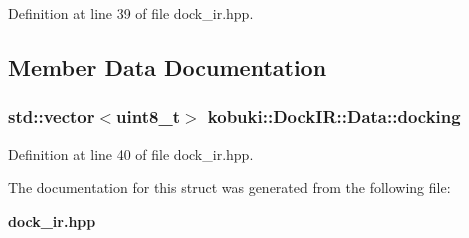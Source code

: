 \-Definition at line 39 of file dock\-\_\-ir.\-hpp.



\subsection{\-Member \-Data \-Documentation}
\subsubsection[{docking}]{\setlength{\rightskip}{0pt plus 5cm}std\-::vector$<$uint8\-\_\-t$>$ {\bf kobuki\-::\-Dock\-I\-R\-::\-Data\-::docking}}\label{structkobuki_1_1DockIR_1_1Data_afbd2446312c797f55a32c8f9077a09be}


\-Definition at line 40 of file dock\-\_\-ir.\-hpp.



\-The documentation for this struct was generated from the following file\-:\begin{DoxyCompactItemize}
\item 
{\bf dock\-\_\-ir.\-hpp}\end{DoxyCompactItemize}
